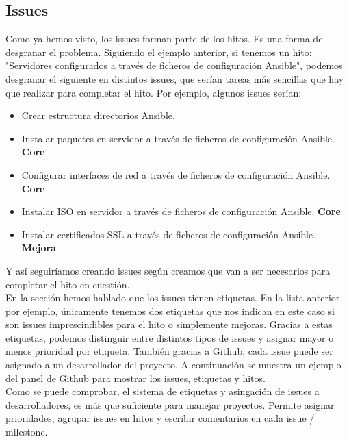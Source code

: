 	\subsection{Issues}
	\begin{paragraph}
		Como ya hemos visto, los issues forman parte de los hitos. Es una forma de desgranar el problema. Siguiendo el ejemplo anterior, si tenemos un hito: "Servidores configurados a través de ficheros de configuración Ansible", podemos desgranar el siguiente en distintos issues, que serían tareas más sencillas que hay que realizar para completar el hito. Por ejemplo, algunos issues serían: 
		\begin{itemize}
			\item Crear estructura directorios Ansible.
			\item Instalar paquetes en servidor a través de ficheros de configuración Ansible. \textbf{Core}
			\item Configurar interfaces de red a través de ficheros de configuración Ansible. \textbf{Core}
			\item Instalar ISO en servidor a través de ficheros de configuración Ansible. \textbf{Core}
			\item Instalar certificados SSL a través de ficheros de configuración Ansible. \textbf{Mejora}
		\end{itemize}
	
		Y así seguiríamos creando issues según creamos que van a ser necesarios para completar el hito en cuestión. \\
		En la sección   hemos hablado que los issues tienen etiquetas. En la lista anterior por ejemplo, únicamente tenemos dos etiquetas que nos indican en este caso si son issues imprescindibles para el hito o simplemente mejoras. Gracias a estas etiquetas, podemos distinguir entre distintos tipos de issues y asignar mayor o menos prioridad por etiqueta. También gracias a Github, cada issue puede ser asignado a un desarrollador del proyecto. A continuación se muestra un ejemplo del panel de Github para mostrar los issues, etiquetas y hitos. \\
		Como se puede comprobar, el sistema de etiquetas y asingación de issues a desarrolladores, es más que suficiente para manejar proyectos. Permite asignar prioridades, agrupar issues en hitos y escribir comentarios en cada issue / milestone. 
		

\end{paragraph}
